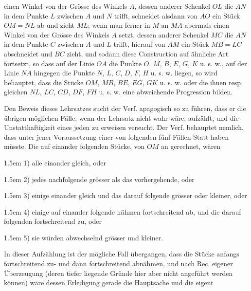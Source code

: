 \par\noindent
\begin{minipage}[t]{.38\textwidth}
\vspace{0pt}
\centering

\end{minipage}\hfill
\begin{minipage}[t]{.58\textwidth}
\vspace{0pt}
einen Winkel von der Grösse des Winkels $A$, dessen anderer Schenkel $OL$ die $AN$ in dem
Punkte $L$ zwischen $A$ und $N$ trifft, schneidet alsdann von $AO$ ein Stück $OM=NL$ ab und
zieht $ML$; wenn man ferner in $M$ an $MA$ abermals einen Winkel von der Grösse des Winkels
$A$ setzt, dessen anderer Schenkel $MC$ die $AN$ in dem Punkte $C$ zwischen $A$ und $L$
trifft, hierauf von $AM$ ein Stück $MB=LC$ abschneidet und $BC$ zieht, und sodann diese
Construction auf ähnliche Art fortsetzt, so dass auf der Linie $OA$ die Punkte $O$, $M$,
$B$, $E$, $G$, $K$ u. s. w., auf der Linie $NA$ hingegen die Punkte $N$, $L$, $C$, $D$,
$F$, $H$ u. s. w. liegen, so wird behauptet, dass die Stücke $OM$, $MB$, $BE$, $EG$, $GK$
u. s. w. oder die ihnen resp. gleichen $NL$, $LC$, $CD$, $DF$, $FH$ u. s. w. eine
abweichende Progression bilden.
\end{minipage}

\medskip
Den Beweis dieses Lehrsatzes sucht der Verf. apagogisch so zu führen, dass er die übrigen
möglichen Fälle, wenn der Lehrsatz nicht wahr wäre, aufzählt, und die Unstatthaftigkeit eines
jeden zu erweisen versucht. Der Verf. behauptet nemlich, dass unter jener Voraussetzung einer
von folgenden fünf Fällen Statt haben müsste. Die auf einander folgenden Stücke, von $OM$ an
gerechnet, wären


\par\hangindent1.5em 1) alle einander gleich, oder
\par\hangindent1.5em 2) jedes nachfolgende grösser als das vorhergehende, oder
\par\hangindent1.5em 3) einige einander gleich und das darauf folgende grösser oder kleiner, oder
\par\hangindent1.5em 4) einige auf einander folgende nähmen fortschreitend ab, und die darauf folgenden
fortschreitend zu, oder
\par\hangindent1.5em 5) sie würden abwechselnd grösser und kleiner.


In dieser Aufzählung ist der mögliche Fall übergangen, dass die Stücke anfangs fortschreitend
zu- und dann fortschreitend abnähmen, und nach Rec. eigener Überzeugung (deren tiefer liegende
Gründe hier aber nicht angeführt werden können) wäre dessen Erledigung gerade die Hauptsache
und die eigent%
